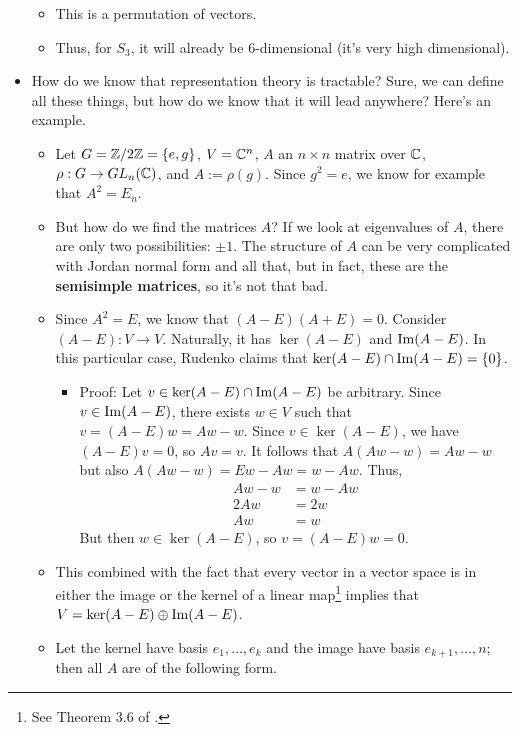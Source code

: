 \documentclass[../notes.tex]{subfiles}
\begin{document}
\begin{itemize}
    \begin{itemize}
        \item This is a permutation of vectors.
        \item Thus, for $S_3$, it will already be 6-dimensional (it's very high dimensional).
    \end{itemize}
    \item How do we know that representation theory is tractable? Sure, we can define all these things, but how do we know that it will lead anywhere? Here's an example.
    \begin{itemize}
        \item Let $G=\mathbb{Z}/2\mathbb{Z}=\{e,g\}$, $V=\mathbb{C}^n$, $A$ an $n\times n$ matrix over $\mathbb{C}$, $\rho:G\to GL_n(\mathbb{C})$, and $A:=\rho(g)$. Since $g^2=e$, we know for example that $A^2=E_n$.
        \item But how do we find the matrices $A$?
        If we look at eigenvalues of $A$, there are only two possibilities: $\pm 1$. The structure of $A$ can be very complicated with Jordan normal form and all that, but in fact, these are the \textbf{semisimple matrices}, so it's not that bad.
        \item Since $A^2=E$, we know that $(A-E)(A+E)=0$. Consider $(A-E):V\to V$. Naturally, it has $\ker(A-E)$ and $\operatorname{Im}(A-E)$. In this particular case, Rudenko claims that $\ker(A-E)\cap\operatorname{Im}(A-E)=\{0\}$.
        \begin{itemize}
            \item Proof: Let $v\in\ker(A-E)\cap\operatorname{Im}(A-E)$ be arbitrary. Since $v\in\operatorname{Im}(A-E)$, there exists $w\in V$ such that $v=(A-E)w=Aw-w$. Since $v\in\ker(A-E)$, we have $(A-E)v=0$, so $Av=v$. It follows that $A(Aw-w)=Aw-w$ but also $A(Aw-w)=Ew-Aw=w-Aw$. Thus,
            \begin{align*}
                Aw-w &= w-Aw\\
                2Aw &= 2w\\
                Aw &= w
            \end{align*}
            But then $w\in\ker(A-E)$, so $v=(A-E)w=0$.
        \end{itemize}
        \item This combined with the fact that every vector in a vector space is in either the image or the kernel of a linear map\footnote{See Theorem 3.6 of \textcite{bib:Axler}.} implies that $V=\ker(A-E)\oplus\operatorname{Im}(A-E)$.
        \item Let the kernel have basis $e_1,\dots,e_k$ and the image have basis $e_{k+1},\dots,n$; then all $A$ are of the following form.

\end{itemize}
\end{itemize}
\end{document}
